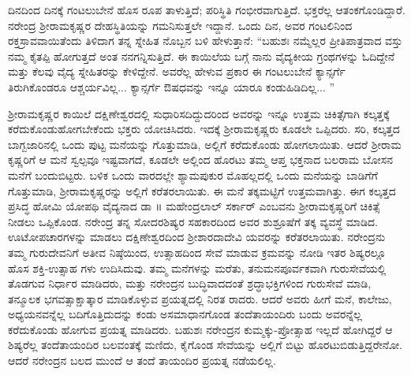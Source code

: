 ದಿನದಿಂದ ದಿನಕ್ಕೆ ಗಂಟಲುಬೇನೆ ಹೊಸ ರೂಪ ತಾಳುತ್ತಿದೆ; ಪರಿಸ್ಥಿತಿ ಗಂಭೀರವಾಗುತ್ತಿದೆ. ಭಕ್ತರೆಲ್ಲ ಆತಂಕಗೊಂಡಿದ್ದಾರೆ. ನರೇಂದ್ರ ಶ್ರೀರಾಮಕೃಷ್ಣರ ದೇಹಸ್ಥಿತಿಯನ್ನು ಗಮನಿಸುತ್ತಲೇ ಇದ್ದಾನೆ. ಒಂದು ದಿನ, ಅವರ ಗಂಟಲಿನಿಂದ ರಕ್ತಸ್ರಾವವಾಯಿತೆಂದು ತಿಳಿದಾಗ ತನ್ನ ಸ್ನೇಹಿತ ನೊಬ್ಬನ ಬಳಿ ಹೇಳುತ್ತಾನೆ: “ಬಹುಶಃ ನಮ್ಮೆಲ್ಲರ ಪ್ರೀತಿಪಾತ್ರವಾದ ವಸ್ತು ನಮ್ಮ ಕೈತಪ್ಪಿ ಹೋಗುತ್ತದೆ ಅಂತ ನನಗನ್ನಿಸುತ್ತಿದೆ. ಈ ಕಾಯಿಲೆಯ ಬಗ್ಗೆ ನಾನು ವೈದ್ಯಕೀಯ ಗ್ರಂಥಗಳನ್ನು ಓದಿದ್ದೇನೆ ಮತ್ತು ಕೆಲವು ವೈದ್ಯ ಸ್ನೇಹಿತರನ್ನು ಕೇಳಿದ್ದೇನೆ. ಅವರೆಲ್ಲ ಹೇಳುವ ಪ್ರಕಾರ ಈ ಗಂಟಲುಬೇನೆ ಕ್ಯಾನ್ಸರ್ಗೆ ತಿರುಗಿಕೊಂಡರೂ ಆಶ್ಚರ್ಯವಿಲ್ಲ... ಕ್ಯಾನ್ಸರ್ಗೆ ಔಷಧವನ್ನು ಇನ್ನೂ ಯಾರೂ ಕಂಡುಹಿಡಿದಿಲ್ಲ... ”

ಶ್ರೀರಾಮಕೃಷ್ಣರ ಕಾಯಿಲೆ ದಕ್ಷಿಣೇಶ್ವರದಲ್ಲಿ ಸುಧಾರಿಸದಿದ್ದುದರಿಂದ ಅವರನ್ನು ಇನ್ನೂ ಉತ್ತಮ ಚಿಕಿತ್ಸೆಗಾಗಿ ಕಲ್ಕತ್ತಕ್ಕೆ ಕರೆದುಕೊಂಡುಹೋಗಬೇಕೆಂದು ಭಕ್ತರು ಯೋಚಿಸಿದರು. ಇದಕ್ಕೆ ಶ್ರೀರಾಮಕೃಷ್ಣರು ಕೂಡಲೇ ಒಪ್ಪಿದರು. ಸರಿ, ಕಲ್ಕತ್ತದ ಬಾಗ್ಬಜಾರಿನಲ್ಲಿ ಒಂದು ಪುಟ್ಟ ಮನೆಯನ್ನು ಗೊತ್ತುಮಾಡಿ, ಅಲ್ಲಿಗೆ ಕರೆದುಕೊಂಡು ಹೋಗಲಾಯಿತು. ಆದರೆ ಶ್ರೀರಾಮ ಕೃಷ್ಣರಿಗೆ ಆ ಮನೆ ಸ್ವಲ್ಪವೂ ಇಷ್ಟವಾಗದೆ, ಕೂಡಲೇ ಅಲ್ಲಿಂದ ಹೊರಟು ತಮ್ಮ ಆಪ್ತ ಭಕ್ತನಾದ ಬಲರಾಮ ಬೋಸನ ಮನೆಗೆ ಬಂದುಬಿಟ್ಟರು. ಬಳಿಕ ಒಂದು ವಾರದಲ್ಲೇ ಶ್ಯಾಮಪುಕುರ ಮೊಹಲ್ಲದಲ್ಲಿ ಒಂದು ಮನೆಯನ್ನು ಬಾಡಿಗೆಗೆ ಗೊತ್ತುಮಾಡಿ, ಶ್ರೀರಾಮಕೃಷ್ಣರನ್ನು ಅಲ್ಲಿಗೆ ಕರೆತರಲಾಯಿತು. ಈ ಮನೆ ತಕ್ಕಮಟ್ಟಿಗೆ ಉತ್ತಮವಾಗಿತ್ತು. ಈಗ ಕಲ್ಕತ್ತದ ಪ್ರಸಿದ್ಧ ಹೋಮಿ ಯೋಪಥಿ ವೈದ್ಯನಾದ ಡಾ ॥ ಮಹೇಂದ್ರಲಾಲ್ ಸರ್ಕಾರ್ ಎಂಬವನು ಶ್ರೀರಾಮಕೃಷ್ಣರಿಗೆ ಚಿಕಿತ್ಸೆ ನೀಡಲು ಒಪ್ಪಿಕೊಂಡ. ನರೇಂದ್ರ ತನ್ನ ಸೋದರಶಿಷ್ಯರ ಸಹಕಾರದಿಂದ ಅವರ ಶುಶ್ರೂಷೆಗೆ ತಕ್ಕ ವ್ಯವಸ್ಥೆ ಮಾಡಿದ. ಊಟೋಪಚಾರಗಳನ್ನು ಮಾಡಲು ದಕ್ಷಿಣೇಶ್ವರದಿಂದ ಶ್ರೀಶಾರದಾದೇವಿ ಯವರನ್ನು ಕರೆತರಲಾಯಿತು. ನರೇಂದ್ರನು ತಮ್ಮ ಗುರುದೇವನಿಗೆ ಅತೀವ ನಿಷ್ಠೆಯಿಂದ, ಉತ್ಸಾಹದಿಂದ ಸೇವೆ ಮಾಡುವ ಕ್ರಮವನ್ನು ನೋಡಿ ಇತರ ಶಿಷ್ಯರಲ್ಲೂ ಹೊಸ ಶಕ್ತಿ-ಉತ್ಸಾಹ ಗಳು ಉದಿಸಿದುವು. ತಮ್ಮ ಮನೆಗಳನ್ನು ಮರೆತು, ತನುಮನಪೂರ್ವಕವಾಗಿ ಗುರುಸೇವೆಯಲ್ಲಿ ತೊಡಗುವ ನಿರ್ಧಾರ ಮಾಡಿದರು, ಮತ್ತು ನರೇಂದ್ರನ ಬುದ್ಧಿವಾದದಂತೆ ಶ್ರದ್ಧಾಭಕ್ತಿಗಳಿಂದ ಗುರುಸೇವೆ ಮಾಡಿ, ತನ್ಮೂಲಕ ಭಗವತ್ಸಾಕ್ಷಾತ್ಕಾರ ಮಾಡಿಕೊಳ್ಳುವ ಪ್ರಯತ್ನದಲ್ಲಿ ನಿರತ ರಾದರು. ಆದರೆ ಅವರು ಹೀಗೆ ಮನೆ, ಕಾಲೇಜು, ಅಧ್ಯಯನವನ್ನೆಲ್ಲ ಬದಿಗೊತ್ತಿದುದನ್ನು ಕಂಡು ಅಸಮಾಧಾನಗೊಂಡ ತಂದೆತಾಯಂದಿರು ಬಂದು ಅವರನ್ನೆಲ್ಲ ಕರೆದುಕೊಂಡು ಹೋಗುವ ಪ್ರಯತ್ನ ಮಾಡಿದರು. ಬಹುಶಃ ನರೇಂದ್ರನ ಕುಮ್ಮಕ್ಕು-ಪ್ರೋತ್ಸಾಹ ಇಲ್ಲದೆ ಹೋಗಿದ್ದರೆ ಆ ಶಿಷ್ಯರೆಲ್ಲ ತಂದೆತಾಯಂದಿರ ಬಲವಂತಕ್ಕೆ ಮಣಿದು, ಕೈಗೊಂಡ ಸೇವೆಯನ್ನು ಅಲ್ಲಿಗೆ ಬಿಟ್ಟು ಹೊರಟುಬಿಡುತ್ತಿದ್ದರೇನೋ. ಆದರೆ ನರೇಂದ್ರನ ಬಲದ ಮುಂದೆ ಆ ತಂದೆ ತಾಯಂದಿರ ಪ್ರಯತ್ನ ನಡೆಯಲಿಲ್ಲ.

